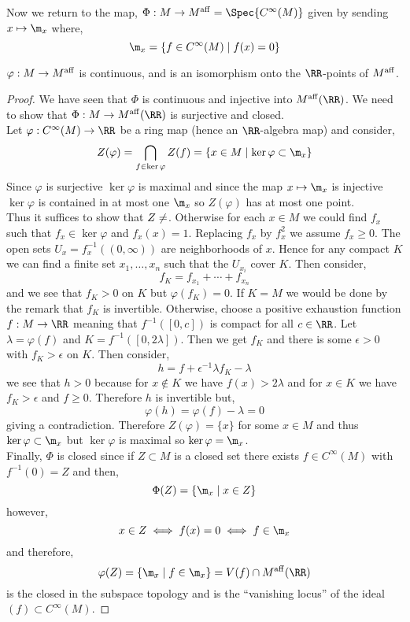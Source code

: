 \documentclass[12pt]{article}
\begin{document}
Now we return to the map, $\Phi : M \to M^{\aff} = \Spec{C^{\infty}(M)}$ given by sending $x \mapsto \m_x$ where,
\[ \m_x = \{ f \in C^{\infty}(M) \mid f(x) = 0 \} \]


\begin{prop}
$\varphi : M \to M^{\mathrm{aff}}$ is continuous, and is an isomorphism onto the $\RR$-points of $M^{\mathrm{aff}}$. 
\end{prop}

\begin{proof}
We have seen that $\Phi$ is continuous and injective into $M^{\aff}(\RR)$. We need to show that $\Phi : M \to M^{\aff}(\RR)$ is surjective and closed. 
\bigskip\\
Let $\varphi : C^{\infty}(M) \to \RR$ be a ring map (hence an $\RR$-algebra map) and consider,
\[ Z(\varphi) = \bigcap_{f \in \ker{\varphi}} Z(f) = \{ x \in M \mid \ker{\varphi} \subset \m_x \} \]
Since $\varphi$ is surjective $\ker{\varphi}$ is maximal and since the map $x \mapsto \m_x$ is injective $\ker{\varphi}$ is contained in at most one $\m_x$ so $Z(\varphi)$ has at most one point.
\bigskip\\
Thus it suffices to show that $Z \neq \empty$. Otherwise for each $x \in M$ we could find $f_x$ such that $f_x \in \ker{\varphi}$ and $f_x(x) = 1$. Replacing $f_x$ by $f_x^2$ we assume $f_x \ge 0$. The open sets $U_x = f_x^{-1}((0, \infty))$ are neighborhoods of $x$. Hence for any compact $K$ we can find a finite set $x_1, \dots, x_n$ such that the $U_{x_i}$ cover $K$. Then consider,
\[ f_K = f_{x_1} + \cdots + f_{x_n} \]
and we see that $f_K > 0$ on $K$ but $\varphi(f_K) = 0$. If $K = M$ we would be done by the remark that $f_K$ is invertible. Otherwise, choose a positive exhaustion function $f : M \to \RR$ meaning that $f^{-1}([0, c])$ is compact for all $c \in \RR$. Let $\lambda = \varphi(f)$ and $K = f^{-1}([0, 2\lambda])$. Then we get $f_K$ and there is some $\epsilon > 0$ with $f_K > \epsilon$ on $K$. Then consider,
\[ h = f + \epsilon^{-1} \lambda f_K - \lambda \]
we see that $h > 0$ because for $x \notin K$ we have $f(x) > 2 \lambda$ and for $x \in K$ we have $f_K > \epsilon$ and $f \ge 0$. Therefore $h$ is invertible but,
\[ \varphi(h) = \varphi(f) - \lambda = 0 \]
giving a contradiction. Therefore $Z(\varphi) = \{ x \}$ for some $x \in M$ and thus $\ker{\varphi} \subset \m_x$ but $\ker{\varphi}$ is maximal so $\ker{\varphi} = \m_x$.
\bigskip\\
Finally, $\Phi$ is closed since if $Z \subset M$ is a closed set there exists $f \in C^\infty(M)$ with $f^{-1}(0) = Z$ and then,
\[ \Phi(Z) = \{ \m_x \mid x \in Z \} \]
however,
\[ x \in Z \iff f(x) = 0 \iff f \in \m_x \]
and therefore,
\[ \varphi(Z) = \{ \m_x \mid f \in \m_x \} = V(f) \cap M^\aff(\RR) \] 
is the closed in the subspace topology and is the ``vanishing locus'' of the ideal $(f) \subset C^\infty(M)$.
\end{proof}
\end{document}
